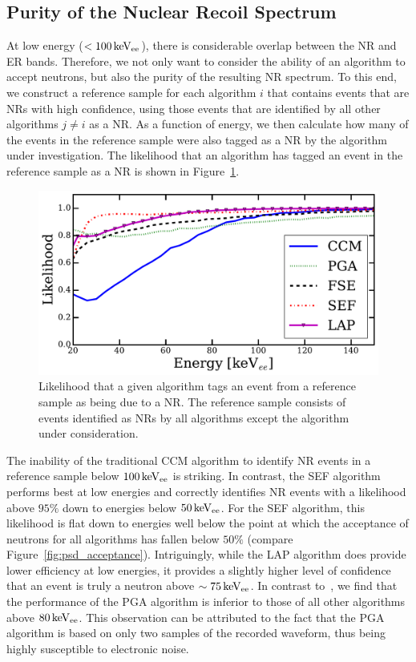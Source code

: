 \subsection{Purity of the Nuclear Recoil Spectrum}

At low energy ($<100\,\mathrm{keV_{ee}}$), there is considerable overlap between the NR and ER bands. Therefore, we not only want to consider the ability of an algorithm to accept neutrons, but also the purity of the resulting NR spectrum. To this end, we construct a reference sample for each algorithm $i$ that contains events that are NRs with high confidence, using those events that are identified by all other algorithms $j\neq i$ as a NR. As a function of energy, we then calculate how many of the events in the reference sample were also tagged as a NR by the algorithm under investigation. The likelihood that an algorithm has tagged an event in the reference sample as a NR is shown in Figure~\ref{fig:n-1_comparison}.

\begin{figure}[htbp]
\centering
    \includegraphics[width = \textwidth]{figures/psd/fig_likelihood}
    \caption{Likelihood that a given algorithm tags an event from a reference sample as being due to a NR. The reference sample consists of events identified as NRs by all algorithms except the algorithm under consideration.}\label{fig:n-1_comparison}
\end{figure}

The inability of the traditional CCM algorithm to identify NR events in a reference sample below $100\,\mathrm{keV_{ee}}$ is striking. In contrast, the SEF algorithm performs best at low energies and correctly identifies NR events with a likelihood above $95\%$ down to energies below $50\,\mathrm{keV_{ee}}$. For the SEF algorithm, this likelihood is flat down to energies well below the point at which the acceptance of neutrons for all algorithms has fallen below $50\%$ (compare Figure~\ref{fig:psd_acceptance}). Intriguingly, while the LAP algorithm does provide lower efficiency at low energies, it provides a slightly higher level of confidence that an event is truly a neutron above $\sim75\,\mathrm{keV_{ee}}$. In contrast to~\cite{DMellow:2007}, we find that the performance of the PGA algorithm is inferior to those of all other algorithms above $80\,\mathrm{keV_{ee}}$. This observation can be attributed to the fact that the PGA algorithm is based on only two samples of the recorded waveform, thus being highly susceptible to electronic noise.

